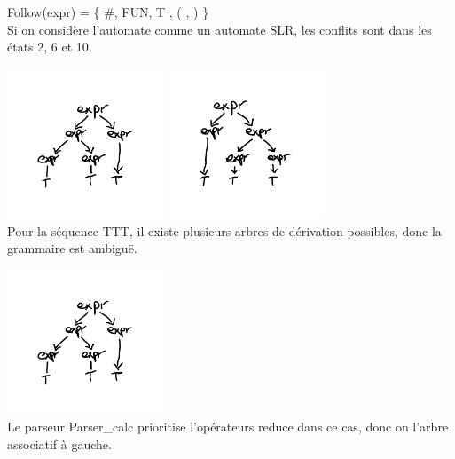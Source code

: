 \documentclass{article}
\begin{document}
{
  Follow(expr) = \{ \#, FUN, T , ( , ) \}
  \\
  Si on considère l'automate comme un automate SLR, les conflits sont dans les 
  états 2, 6 et 10.
}
{}

{
  \includegraphics[width=0.35\textwidth,height=\textheight,keepaspectratio]
  {./assets/TTT_left.png} 
  \includegraphics[width=0.35\textwidth,height=\textheight,keepaspectratio]
  {./assets/TTT_right.png}
  \\
  Pour la séquence TTT, il existe plusieurs arbres de dérivation possibles,
  donc la grammaire est ambiguë.
}
{}

{
  \includegraphics[width=0.35\textwidth,height=\textheight,keepaspectratio]
  {./assets/TTT_left.png} 
  \\
  Le parseur Parser\_calc prioritise l'opérateurs reduce dans ce cas, donc on l'arbre associatif à gauche.
}
{}
\end{document}
